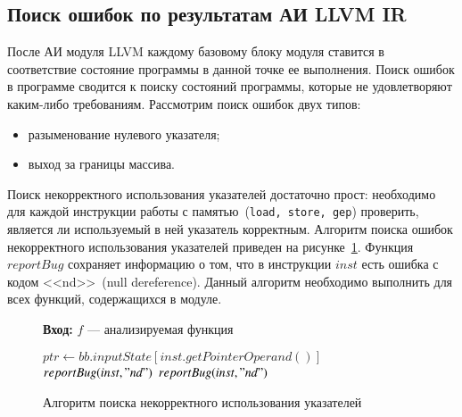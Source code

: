 \subsection{Поиск ошибок по результатам АИ LLVM IR}
После АИ модуля LLVM каждому базовому блоку модуля ставится в соответствие
состояние программы в данной точке ее выполнения. Поиск ошибок в программе
сводится к поиску состояний программы, которые не удовлетворяют каким-либо
требованиям. Рассмотрим поиск ошибок двух типов:
\begin{itemize}
\item разыменование нулевого указателя;
\item выход за границы массива.
\end{itemize}

Поиск некорректного использования указателей достаточно прост: необходимо для
каждой инструкции работы с памятью~(\texttt{load, store, gep}) проверить, 
является ли используемый в ней указатель корректным. Алгоритм поиска ошибок
некорректного использования указателей приведен на 
рисунке~\ref{image:ndChecker}. Функция $reportBug$ сохраняет информацию
о том, что в инструкции $inst$ есть ошибка с кодом <<nd>>~(null dereference). 
Данный алгоритм необходимо выполнить для всех функций, содержащихся в модуле.
\begin{figure}[h!]
\textbf{Вход:} $f$ --- анализируемая функция

\begin{algorithmic}[1]
            \State $ptr \gets bb.inputState[inst.getPointerOperand()]$
                \State $reportBug(inst, "nd")$
                \State $reportBug(inst, "nd")$
            \EndIf
        \EndIf
    \EndFor
\EndFor
\end{algorithmic}
\caption{Алгоритм поиска некорректного использования указателей}
\label{image:ndChecker}
\end{figure}

